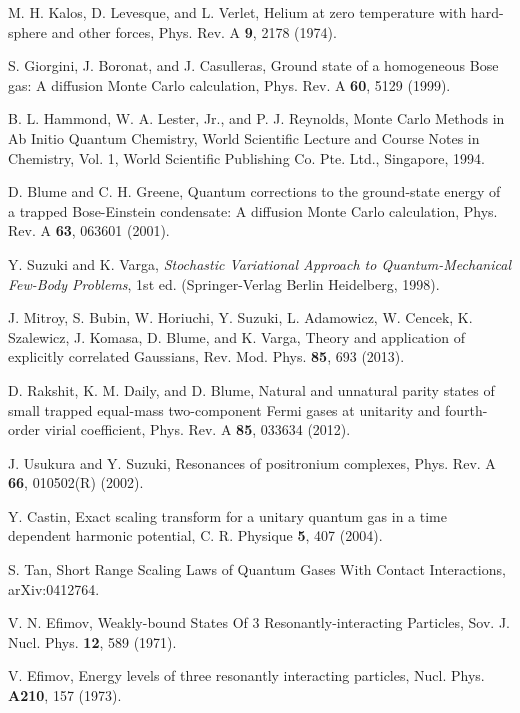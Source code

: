 \documentclass[aps,pra,twocolumn,showpacs,superscriptaddress]{revtex4}
\begin{document}
\begin{thebibliography}{100}
    M. H. Kalos, D. Levesque, and L. Verlet,
Helium at zero temperature with hard-sphere and other forces,
    Phys. Rev. A {\bf{9}}, 2178 (1974).
  
S. Giorgini, J. Boronat, and J. Casulleras,
Ground state of a homogeneous Bose gas: A diffusion Monte Carlo calculation,
Phys. Rev. A {\bf{60}}, 5129 (1999).

  B. L. Hammond, W. A. Lester, Jr., and P. J. Reynolds,
  Monte Carlo Methods in Ab Initio Quantum Chemistry,
  World Scientific Lecture and Course Notes in Chemistry, Vol. 1,
  World Scientific Publishing Co. Pte. Ltd., Singapore, 1994.

D. Blume and C. H. Greene,
Quantum corrections to the ground-state energy of a trapped Bose-Einstein condensate:
A diffusion Monte Carlo calculation,
Phys. Rev. A {\bf{63}}, 063601 (2001). 

Y. Suzuki and K. Varga,
{\it{Stochastic Variational Approach to Quantum-Mechanical Few-Body Problems}},
1st ed. (Springer-Verlag Berlin Heidelberg, 1998).

J. Mitroy, S. Bubin, W. Horiuchi, Y. Suzuki, L. Adamowicz, 
W. Cencek, K. Szalewicz, J. Komasa, D. Blume, and K. Varga,  
Theory and application of explicitly correlated Gaussians,
Rev. Mod. Phys. {\bf{85}}, 693 (2013). 

D. Rakshit, K. M. Daily, and D. Blume,
Natural and unnatural parity states of small trapped equal-mass
two-component Fermi gases at unitarity and fourth-order virial coefficient,
Phys. Rev. A {\bf{85}}, 033634 (2012).

J. Usukura and Y. Suzuki,
Resonances of positronium complexes,
Phys. Rev. A {\bf{66}}, 010502(R) (2002).

Y. Castin,
Exact scaling transform for a unitary quantum gas in a time 
dependent harmonic potential,
C. R. Physique {\bf{5}}, 407 (2004).

S. Tan,
Short Range Scaling Laws of Quantum Gases With Contact Interactions,
arXiv:0412764.

V. N. Efimov, 
Weakly-bound States Of 3 Resonantly-interacting Particles,
Sov. J. Nucl. Phys. {\bf{12}}, 589 (1971).

V. Efimov, 
Energy levels of three resonantly interacting particles,
Nucl. Phys. {\bf{A210}}, 157 (1973).


\end{thebibliography}
\end{document}
